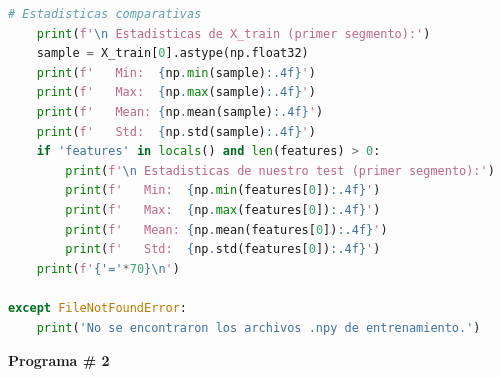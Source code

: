 \documentclass[12pt]{report}
\begin{document}
\begin{lstlisting}[language=Python, caption={Prueba de extracción de características acústicas (MFCC) y validación de la representación numérica del audio.o}, label={lst:waveform}]
    # Estadisticas comparativas
    print(f'\n Estadisticas de X_train (primer segmento):')
    sample = X_train[0].astype(np.float32)
    print(f'   Min:  {np.min(sample):.4f}')
    print(f'   Max:  {np.max(sample):.4f}')
    print(f'   Mean: {np.mean(sample):.4f}')
    print(f'   Std:  {np.std(sample):.4f}')
    if 'features' in locals() and len(features) > 0:
        print(f'\n Estadisticas de nuestro test (primer segmento):')
        print(f'   Min:  {np.min(features[0]):.4f}')
        print(f'   Max:  {np.max(features[0]):.4f}')
        print(f'   Mean: {np.mean(features[0]):.4f}')
        print(f'   Std:  {np.std(features[0]):.4f}')
    print(f'{'='*70}\n')

except FileNotFoundError:
    print('No se encontraron los archivos .npy de entrenamiento.')
\end{lstlisting}


\pagebreak

\begin{center}
\large\textbf{Programa \# 2}
\end{center}
\end{document}
